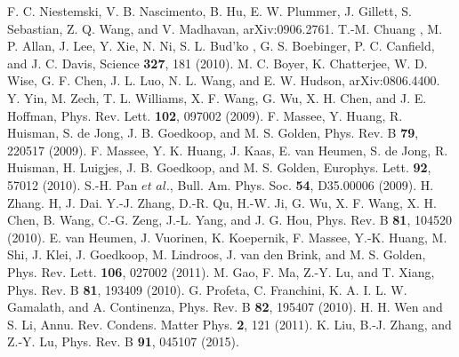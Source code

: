 \documentclass[twocolumn,aps,showpacs,prb]{revtex4-1}
\begin{document}
\begin{thebibliography}{}
F. C. Niestemski, V. B. Nascimento, B. Hu, E. W. Plummer, J. Gillett, S. Sebastian, Z. Q. Wang, and V. Madhavan, arXiv:0906.2761.
T.-M. Chuang , M. P. Allan, J. Lee, Y. Xie, N. Ni, S. L. Bud'ko , G. S. Boebinger, P. C. Canfield, and J. C. Davis, Science {\bf 327}, 181 (2010).
M. C. Boyer, K. Chatterjee, W. D. Wise, G. F. Chen, J. L. Luo, N. L. Wang, and E. W. Hudson, arXiv:0806.4400.
Y. Yin, M. Zech, T. L. Williams, X. F. Wang, G. Wu, X. H. Chen, and J. E. Hoffman, Phys. Rev. Lett. {\bf 102}, 097002 (2009).
F. Massee, Y. Huang, R. Huisman, S. de Jong, J. B. Goedkoop, and M. S. Golden, Phys. Rev. B {\bf 79}, 220517 (2009).
F. Massee, Y. K. Huang, J. Kaas, E. van Heumen, S. de Jong, R. Huisman, H. Luigjes, J. B. Goedkoop, and M. S. Golden, Europhys. Lett. {\bf 92}, 57012 (2010).
S.-H. Pan $et$ $al$., Bull. Am. Phys. Soc. {\bf 54}, D35.00006 (2009).
H. Zhang. H, J. Dai. Y.-J. Zhang, D.-R. Qu, H.-W. Ji, G. Wu, X. F. Wang, X. H. Chen, B. Wang, C.-G. Zeng, J.-L. Yang, and J. G. Hou, Phys. Rev. B {\bf 81}, 104520 (2010).
E. van Heumen, J. Vuorinen, K. Koepernik, F. Massee, Y.-K. Huang, M. Shi, J. Klei, J. Goedkoop, M. Lindroos, J. van den Brink, and M. S. Golden, Phys. Rev. Lett. {\bf 106}, 027002 (2011).
M. Gao, F. Ma, Z.-Y. Lu, and T. Xiang, Phys. Rev. B {\bf 81}, 193409 (2010).
G. Profeta, C. Franchini, K. A. I. L. W. Gamalath, and A. Continenza, Phys. Rev. B {\bf 82}, 195407 (2010).
H. H. Wen and S. Li, Annu. Rev. Condens. Matter Phys. {\bf 2}, 121 (2011).
K. Liu, B.-J. Zhang, and Z.-Y. Lu, Phys. Rev. B {\bf 91}, 045107 (2015).

\end{thebibliography}
\end{document}
